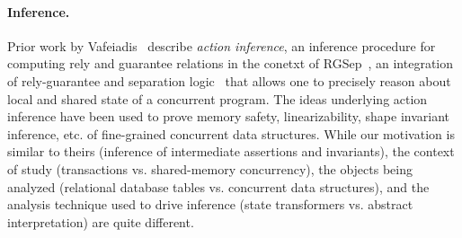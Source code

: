 
\vspace*{-4pt}
\paragraph{Inference.}  Prior work by Vafeiadis~\cite{Vaf10,Vaf10a}
describe \emph{action inference}, an inference procedure for computing
rely and guarantee relations in the conetxt of RGSep~\cite{VP07}, an
integration of rely-guarantee and separation logic~\cite{Rey02} that
allows one to precisely reason about local and shared state of a
concurrent program. The ideas underlying action inference have been
used to prove memory safety, linearizability, shape invariant
inference, etc.  of fine-grained concurrent data structures.  While
our motivation is similar to theirs (inference of intermediate
assertions and invariants), the context of study (transactions
vs. shared-memory concurrency), the objects being analyzed (relational
database tables vs. concurrent data structures), and the analysis
technique used to drive inference (state transformers vs. abstract
interpretation) are quite different.

